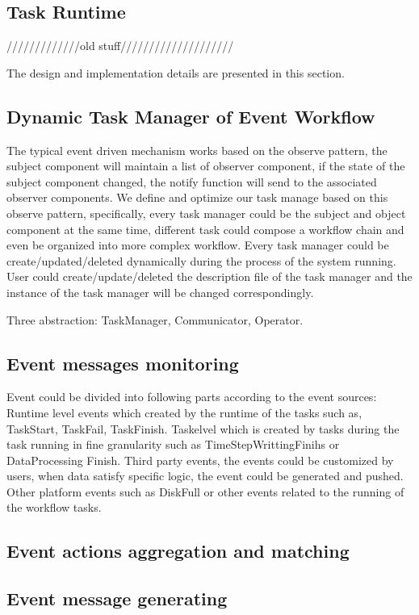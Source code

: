 \subsection{Task Runtime}



/////////////old stuff////////////////////

The design and implementation details are presented in this section.
\subsection{Dynamic Task Manager of Event Workflow}
The typical event driven mechanism works based on the observe pattern, the subject component will maintain a list of observer component, if the state of the subject component changed, the notify function will send to the associated observer components. We define and optimize our task manage based on this observe pattern, specifically, every task manager could be the subject and object component at the same time, different task could compose a workflow chain and even be organized into more complex workflow. Every task manager could be create/updated/deleted dynamically during the process of the system running. User could create/update/deleted the description file of the task manager and the instance of the task manager will be changed correspondingly.


Three abstraction: TaskManager, Communicator, Operator.

\subsection{Event messages monitoring}
Event could be divided into following parts according to the event sources:
Runtime level events which created by the runtime of the tasks such as, TaskStart, TaskFail, TaskFinish.
Taskelvel which is created by tasks during the task running in fine granularity such as TimeStepWrittingFinihs or DataProcessing Finish.
Third party events, the events could be customized by users, when data satisfy specific logic, the event could be generated and pushed.
Other platform events such as DiskFull or other events related to the running of the workflow tasks.
\subsection{Event actions aggregation and matching}
\subsection{Event message generating}

